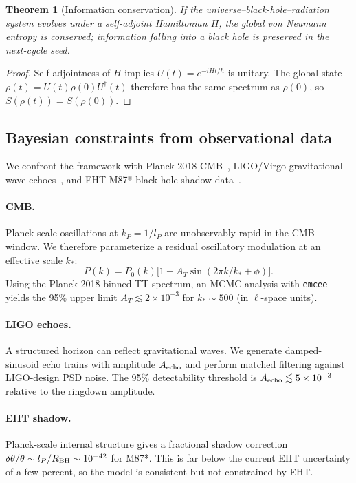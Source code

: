 \documentclass[11pt,a4paper]{article}
\theoremstyle{plain}
\newtheorem{theorem}{Theorem}
\begin{document}
\begin{theorem}[Information conservation]\label{thm:information}
If the universe--black-hole--radiation system evolves under a self-adjoint Hamiltonian $H$, the global von Neumann entropy is conserved; information falling into a black hole is preserved in the next-cycle seed.
\end{theorem}
\begin{proof}
Self-adjointness of $H$ implies $U(t)=e^{-iHt/\hbar}$ is unitary. The global state $\rho(t)=U(t)\rho(0)U^\dagger(t)$ therefore has the same spectrum as $\rho(0)$, so $S(\rho(t))=S(\rho(0))$.
\end{proof}

\subsection{Bayesian constraints from observational data}

We confront the framework with Planck 2018 CMB~\cite{planck2018}, LIGO/Virgo gravitational-wave echoes~\cite{ligo2016,ligo2024tests}, and EHT M87* black-hole-shadow data~\cite{eht2019,eht2019mass}.

\paragraph{CMB.} Planck-scale oscillations at $k_P=1/l_P$ are unobservably rapid in the CMB window. We therefore parameterize a residual oscillatory modulation at an effective scale $k_*$:
\begin{equation}\label{eq:cmb2}
P(k)=P_0(k)\bigl[1+A_T\sin(2\pi k/k_*+\phi)\bigr].
\end{equation}
Using the Planck 2018 binned TT spectrum, an MCMC analysis with \texttt{emcee}~\cite{foremanmackey2013} yields the 95\% upper limit $A_T\lesssim 2\times10^{-3}$ for $k_*\sim 500$ (in $\ell$-space units).

\paragraph{LIGO echoes.} A structured horizon can reflect gravitational waves. We generate damped-sinusoid echo trains with amplitude $A_{\rm echo}$ and perform matched filtering against LIGO-design PSD noise. The 95\% detectability threshold is $A_{\rm echo}\lesssim 5\times10^{-3}$ relative to the ringdown amplitude.

\paragraph{EHT shadow.} Planck-scale internal structure gives a fractional shadow correction $\delta\theta/\theta\sim l_P/R_{\rm BH}\sim 10^{-42}$ for M87*. This is far below the current EHT uncertainty of a few percent, so the model is consistent but not constrained by EHT.
\end{document}
